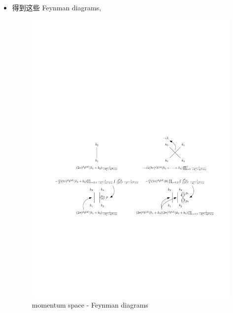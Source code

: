 \begin{itemize}
	\item 得到这些 Feynman diagrams,
	
	\begin{figure}[H]
		\centering
		\includegraphics[scale=1]{figures/collision between particles - Feynman diagrams (in momentum space).pdf}
		\caption{momentum space - Feynman diagrams}
		\label{figure 3.3}
	\end{figure}
	

\end{itemize}
